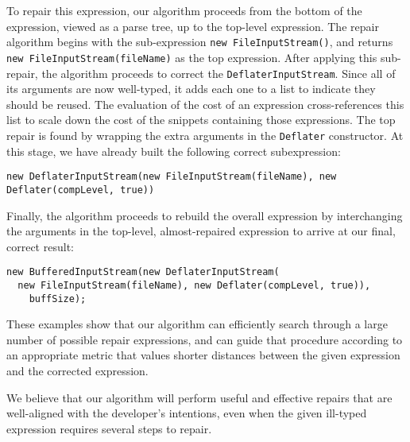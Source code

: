 To repair this expression, our algorithm proceeds from the bottom of the expression, viewed as a parse tree, up to the top-level expression. The repair algorithm begins with the sub-expression \lstinline{new FileInputStream()}, and returns \lstinline{new FileInputStream(fileName)} as the top expression. After applying this sub-repair, the algorithm proceeds to correct the \lstinline{DeflaterInputStream}. Since all of its arguments are now well-typed, it adds each one to a list to indicate they should be reused. The evaluation of the cost of an expression cross-references this list to scale down the cost of the snippets containing those expressions. The top repair is found by wrapping the extra arguments in the \lstinline{Deflater} constructor. At this stage, we have already built the following correct subexpression:
\begin{lstlisting}
new DeflaterInputStream(new FileInputStream(fileName), new Deflater(compLevel, true))
\end{lstlisting}
Finally, the algorithm proceeds to rebuild the overall expression by interchanging the arguments in the top-level, almost-repaired expression to arrive at our final, correct result:
\begin{lstlisting}   
new BufferedInputStream(new DeflaterInputStream(
  new FileInputStream(fileName), new Deflater(compLevel, true)),
    buffSize);
\end{lstlisting}
These examples show that our algorithm can efficiently search through a large number of possible repair expressions, and can guide that procedure according to an appropriate metric that values shorter distances between the given expression and the corrected expression.

We believe that our algorithm will perform useful and effective repairs that are well-aligned with the developer's intentions, even when the given ill-typed expression requires several steps to repair.
